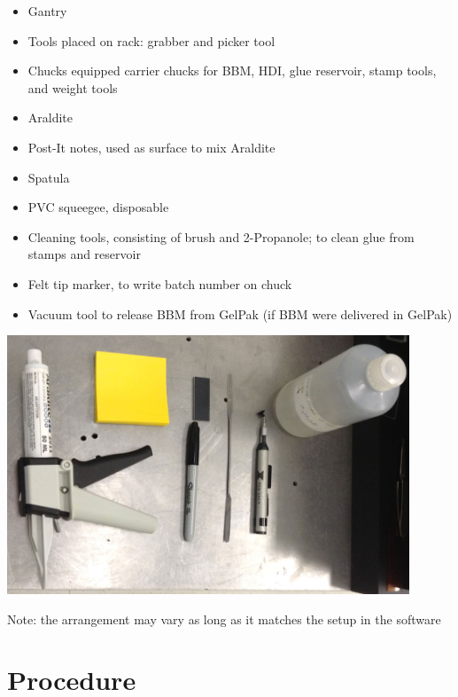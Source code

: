 \documentclass[12pt]{unlsilabsop}
\begin{document}
\begin{itemize}
    \item Gantry
    \item Tools placed on rack: grabber and picker tool
    \item Chucks equipped carrier chucks for BBM, HDI, glue reservoir, stamp tools, and weight tools
    \item Araldite
    \item Post-It notes, used as surface to mix Araldite
    \item Spatula
    \item PVC squeegee, disposable
    \item Cleaning tools, consisting of brush and 2-Propanole; to clean glue from stamps and reservoir
    \item Felt tip marker, to write batch number on chuck
    \item Vacuum tool to release BBM from GelPak (if BBM were delivered in GelPak)
\end{itemize}
\begin{center}
\includegraphics[width=0.9\textwidth]{img/gluingMaterials.jpg}
\end{center}


Note: the arrangement may vary as long as it matches the setup in the software

\section{Procedure}
\end{document}
